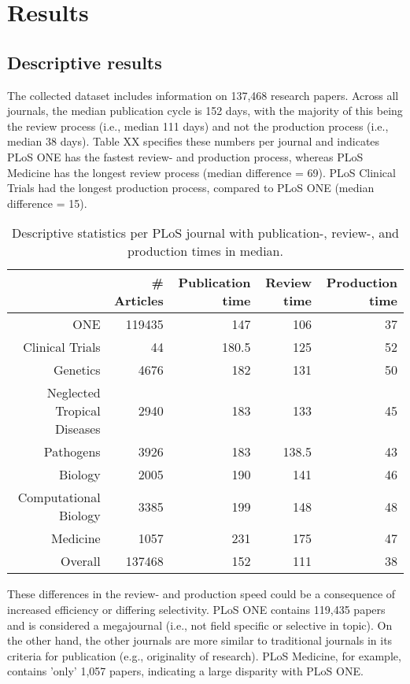 \section*{Results}
\subsection*{Descriptive results}
The collected dataset includes information on 137,468 research papers. Across all journals, the median publication cycle is 152 days, with the majority of this being the review process (i.e., median 111 days) and not the production process (i.e., median 38 days). Table XX specifies these numbers per journal and indicates PLoS ONE has the fastest review- and production process, whereas PLoS Medicine has the longest review process (median difference = 69). PLoS Clinical Trials had the longest production process, compared to PLoS ONE (median difference = 15).

\begin{table}[htbp]
  \centering
  \caption{Descriptive statistics per PLoS journal with publication-, review-, and production times in median.}
    \begin{tabular}{rrrrr}
    \toprule
          & \# Articles & Publication time & Review time & Production time \\
    \midrule
    ONE   & 119435 & 147   & 106   & 37 \\
    Clinical Trials & 44    & 180.5 & 125   & 52 \\
    Genetics & 4676  & 182   & 131   & 50 \\
    Neglected Tropical Diseases & 2940  & 183   & 133   & 45 \\
    Pathogens & 3926  & 183   & 138.5 & 43 \\
    Biology & 2005  & 190   & 141   & 46 \\
    Computational Biology & 3385  & 199   & 148   & 48 \\
    Medicine & 1057  & 231   & 175   & 47 \\
    Overall & 137468 & 152   & 111   & 38 \\
    \bottomrule
    \end{tabular}%
  \label{tab1}%
\end{table}%

These differences in the review- and production speed could be a consequence of increased efficiency or differing selectivity. PLoS ONE contains 119,435 papers and is considered a megajournal (i.e., not field specific or selective in topic). On the other hand, the other journals are more similar to traditional journals in its criteria for publication (e.g., originality of research). PLoS Medicine, for example, contains 'only' 1,057 papers, indicating a large disparity with PLoS ONE. 

